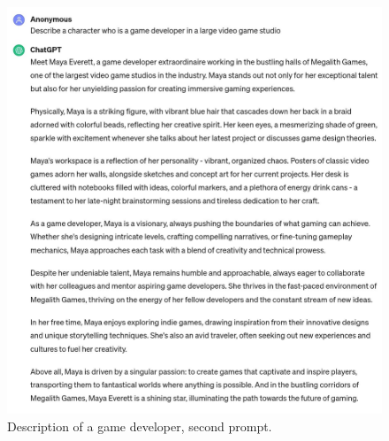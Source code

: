 \documentclass[a4paper]{article}
\begin{document}
\begin{figure}[H]
  \begin{center}
    \includegraphics[width=\textwidth]{task3/character_description_2.jpg}
    \caption{Description of a game developer, second prompt.}
    \label{fig:character description 2}
  \end{center}
\end{figure}
\end{document}
